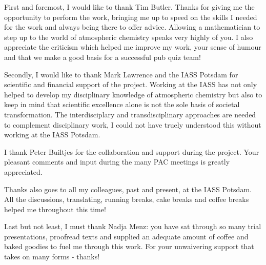 First and foremost, I would like to thank Tim Butler. 
Thanks for giving me the opportunity to perform the work, bringing me up to speed on the skills I needed for the work and always being there to offer advice. 
Allowing a mathematician to step up to the world of atmospheric chemistry speaks very highly of you.
I also appreciate the criticism which helped me improve my work, your sense of humour and that we make a good basis for a successful pub quiz team!

Secondly, I would like to thank Mark Lawrence and the IASS Potsdam for scientific and financial support of the project.
Working at the IASS has not only helped to develop my disciplinary knowledge of atmospheric chemistry but also to keep in mind that scientific excellence alone is not the sole basis of societal transformation.
The interdisciplary and transdisciplinary approaches are needed to complement disciplinary work, I could not have truely understood this without working at the IASS Potsdam.

I thank Peter Builtjes for the collaboration and support during the project.
Your pleasant comments and input during the many PAC meetings is greatly appreciated.

Thanks also goes to all my colleagues, past and present, at the IASS Potsdam.
All the discussions, translating, running breaks, cake breaks and coffee breaks helped me throughout this time!

Last but not least, I must thank Nadja Menz: you have sat through so many trial presentations, proofread texts and supplied an adequate amount of coffee and baked goodies to fuel me through this work. 
For your unwaivering support that takes on many forms - thanks!
